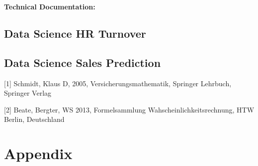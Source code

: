 \documentclass[]{book}
\begin{document}
\textbf{Technical Documentation: }

\section{Data Science HR Turnover}\label{data-science-hr-turnover}

\section{Data Science Sales
Prediction}\label{data-science-sales-prediction}

{[}1{]} Schmidt, Klaus D, 2005, Versicherungsmathematik, Springer
Lehrbuch, Springer Verlag

{[}2{]} Beate, Bergter, WS 2013, Formelsammlung
Wahscheinlichkeitsrechnung, HTW Berlin, Deutschland

\chapter{Appendix}\label{appendix}


\end{document}
